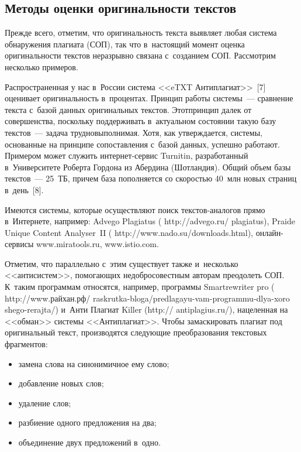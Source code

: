 \begin{multicols}{2}
\section{Методы оценки оригинальности текстов}

   Прежде всего, отметим, что оригинальность текс\-та выявляет любая
система обнаружения плагиата (СОП), так что в~настоящий момент оценка
оригинальности текстов неразрывно связана с~созданием СОП. Рассмотрим
несколько примеров.

   Распространенная у нас в~России система <<eTXT Антиплагиат>>~[7]
оценивает оригинальность в~процентах. Принцип работы системы~---
сравнение текс\-та с~базой данных оригинальных текс\-тов. Этот\linebreak принцип далек
от совершенства, поскольку поддерживать в~актуальном состоянии такую
базу текс\-тов~--- задача трудновыполнимая. Хотя, как утверждается, системы,
основанные на принципе сопоставле\-ния с~базой данных, успешно работают.
Примером может служить ин\-тер\-нет-сер\-вис Turnitin, разработанный
в~Университете Роберта Гордона из Абердина (Шотландия). Общий объем
базы текстов~--- 25~ТБ, причем база пополняется со скоростью 40~млн
новых страниц в~день~[8].

   Имеются системы, которые осуществляют поиск текс\-тов-ана\-ло\-гов
прямо в~Интернете, например: Advego Plagiatus ({\sf
http://advego.ru/ plagiatus}), Praide Unique Content Analyser~II ({\sf
http://www.nado.su/downloads.html}), он\-лайн-сер\-ви\-сы {\sf
www.miratools.ru, www.istio.com}.

   Отметим, что параллельно с~этим существует также и~несколько
<<антисистем>>, помо\-га\-ющих недобросовестным авторам преодолеть СОП.\linebreak
К~таким программам относятся, например, программы Smartrewriter pro ({\sf
http://www.райхан.рф/ raskrutka-bloga/predlagayu-vam-programmu-dlya-xoro
shego-rerajta/}) и~Анти Плагиат Killer ({\sf http:// antiplagius.ru/}),
нацеленная на <<обман>> системы <<Антиплагиат>>. Чтобы замаскировать
плагиат под оригинальный текст, производятся следующие преобразования
текстовых фрагментов:
   \begin{itemize}
\item замена слова на синонимичное ему слово;
\item добавление новых слов;
\item удаление слов;
\item разбиение одного предложения на два;
\item объединение двух предложений в~одно.
\end{itemize}


\end{multicols}
